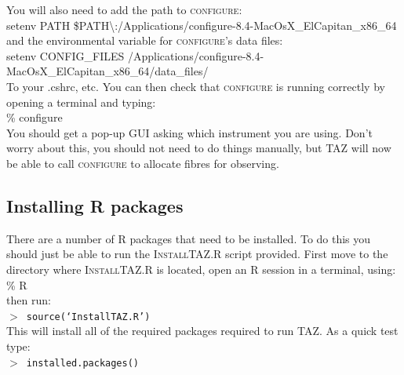 \documentclass[12pt]{article}
\begin{document}
You will also need to add the path to \textsc{configure}:\\

\hspace{10mm} setenv PATH \$PATH\textbackslash:/Applications/configure-8.4-MacOsX\_ElCapitan\_x86\_64\\

and the environmental variable for \textsc{configure}'s data files:\\

\hspace{10mm}  setenv CONFIG\_FILES /Applications/configure-8.4-MacOsX\_ElCapitan\_x86\_64/data\_files/\\

To your .cshrc, etc.  You can then check that \textsc{configure} is running correctly by opening a terminal and typing: \\

\hspace{10mm} \% configure\\

You should get a pop-up GUI asking which instrument you are using. Don't worry about this, you should not need to do things manually, but \textsc{TAZ} will now be able to call \textsc{configure} to allocate fibres for observing.

\subsection{Installing R packages}

There are a number of R packages that need to be installed. To do this you should just be able to run the \textsc{InstallTAZ.R} script provided. First move to the directory where \textsc{InstallTAZ.R} is located, open an R session in a terminal, using:\\

\hspace{10mm} \% R\\

then run:\\

\hspace{10mm}  \texttt{$>$ source(`InstallTAZ.R')}\\

This will install all of the required packages required to run \textsc{TAZ}. As a quick test type:\\

\hspace{10mm}  \texttt{$>$ installed.packages()}\\
\end{document}
